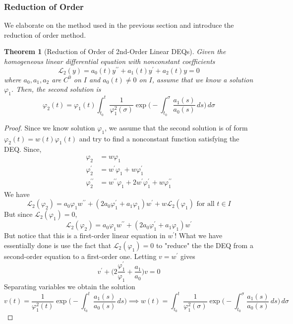 \documentclass{article}
\newtheorem{theorem}{Theorem}[section]
\theoremstyle{remark}
\theoremstyle{definition}
\begin{document}
    \subsubsection{Reduction of Order}

      We elaborate on the method used in the previous section and introduce the reduction of order method. 

      \begin{theorem}[Reduction of Order of 2nd-Order Linear DEQs]
      Given the homogeneous linear differential equation with nonconstant coefficients 
      \[\mathcal{L}_2 (y) = a_0 (t) y^{\prime\prime} + a_1 (t) y^\prime + a_2 (t) y = 0\]
      where $a_0, a_1, a_2$ are $C^0$ on $I$ and $a_0 (t) \neq 0$ on $I$, assume that we know a solution $\varphi_1$. Then, the second solution is
      \[\varphi_2 (t) = \varphi_1 (t) \int_{t_0}^t \frac{1}{\varphi_1^2 (\sigma)} \exp \bigg(- \int_{t_0}^\sigma \frac{a_1 (s)}{a_0 (s)}\,ds \bigg) \, d\sigma\]
      \end{theorem}
      \begin{proof}
      Since we know solution $\varphi_1$, we assume that the second solution is of form $\varphi_2 (t) = w (t) \varphi_1 (t)$ and try to find a nonconstant function satisfying the DEQ. Since,
      \begin{align*}
          \varphi_2 & = w \varphi_1 \\
          \varphi_2^\prime & = w^\prime \varphi_1 + w \varphi_1^\prime \\
          \varphi_2^{\prime\prime} & = w^{\prime\prime} \varphi_1 + 2 w^\prime \varphi_1^\prime + w \varphi_1^{\prime\prime}
      \end{align*}
      We have
      \[\mathcal{L}_2 (\varphi_2) = a_0 \varphi_1 w^{\prime\prime} + (2 a_0 \varphi_1^\prime + a_1 \varphi_1) w^\prime + w \mathcal{L}_2 (\varphi_1) \text{ for all } t \in I\]
      But since $\mathcal{L}_2 (\varphi_1) = 0$, 
      \[\mathcal{L}_2 (\varphi_2) = a_0 \varphi_1 w^{\prime\prime} + (2 a_0 \varphi_1^\prime + a_1 \varphi_1) w^\prime\]
      But notice that this is a first-order linear equation in $w^\prime$! What we have essentially done is use the fact that $\mathcal{L}_2 (\varphi_1) = 0$ to "reduce" the the DEQ from a second-order equation to a first-order one. Letting $v = w^\prime$ gives 
      \[v^\prime + \bigg( 2 \frac{\varphi_1^\prime}{\varphi_1} + \frac{a_1}{a_0} \bigg) v = 0\]
      Separating variables we obtain the solution
      \[v(t) = \frac{1}{\varphi_1^2 (t)} \exp \bigg(- \int_{t_0}^t \frac{a_1(s)}{a_0 (s)} \,ds \bigg) \implies w(t) = \int_{t_0}^t \frac{1}{\varphi_1^2 (\sigma)} \exp \bigg(- \int_{t_0}^\sigma \frac{a_1(s)}{a_0 (s)} \,ds \bigg) \,d\sigma \]
      \end{proof}
\end{document}
